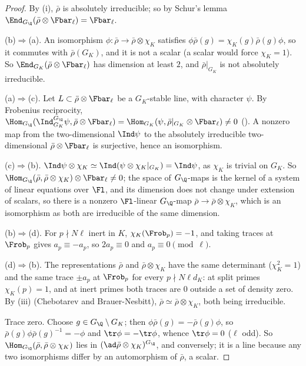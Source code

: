 \begin{proof}
By (i), $\bar\rho$ is absolutely irreducible; so by Schur's lemma $\End_{G_\Q}(\bar\rho\otimes\Fbar_\ell)=\Fbar_\ell$.

(b)$\Rightarrow$(a). An isomorphism $\phi\colon\bar\rho\to\bar\rho\otimes\chi_K$ satisfies $\phi\bar\rho(g)=\chi_K(g)\bar\rho(g)\phi$, so it commutes with $\bar\rho(G_K)$, and it is not a scalar
(a scalar would force $\chi_K=1$). So $\End_{G_K}(\bar\rho\otimes\Fbar_\ell)$ has dimension at least $2$, and $\bar\rho|_{G_K}$ is not absolutely irreducible.

(a)$\Rightarrow$(c). Let $L\subset\bar\rho\otimes\Fbar_\ell$ be a $G_K$-stable line, with character $\psi$. By Frobenius reciprocity,
$\Hom_{G_\Q}(\Ind_{G_K}^{G_\Q}\psi,\bar\rho\otimes\Fbar_\ell)=\Hom_{G_K}(\psi,\bar\rho|_{G_K}\otimes\Fbar_\ell)\ne0$ (). A nonzero map from the two-dimensional $\Ind\psi$
to the absolutely irreducible two-dimensional $\bar\rho\otimes\Fbar_\ell$ is surjective, hence an isomorphism.

(c)$\Rightarrow$(b). $\Ind\psi\otimes\chi_K\simeq\Ind(\psi\otimes\chi_K|_{G_K})=\Ind\psi$, as $\chi_K$ is trivial on $G_K$. So $\Hom_{G_\Q}(\bar\rho,\bar\rho\otimes\chi_K)\otimes\Fbar_\ell\ne0$; the space of
$G_\Q$-maps is the kernel of a system of linear equations over $\Fl$, and its dimension does not change under extension of scalars, so there is a
nonzero $\Fl$-linear $G_\Q$-map $\bar\rho\to\bar\rho\otimes\chi_K$, which is an isomorphism as both are irreducible of the same dimension.

(b)$\Rightarrow$(d). For $p\nmid N\ell$ inert in $K$, $\chi_K(\Frob_p)=-1$, and taking traces at $\Frob_p$ gives $a_p\equiv-a_p$, so $2a_p\equiv0$ and $a_p\equiv0\pmod\ell$.

(d)$\Rightarrow$(b). The representations $\bar\rho$ and $\bar\rho\otimes\chi_K$ have the same determinant ($\chi_K^2=1$) and the same trace $\pm a_p$ at $\Frob_p$ for every
$p\nmid N\ell d_K$: at split primes $\chi_K(p)=1$, and at inert primes both traces are $0$ outside a set of density zero. By
(iii) (Chebotarev and Brauer-Nesbitt), $\bar\rho\simeq\bar\rho\otimes\chi_K$, both being irreducible.

Trace zero. Choose $g\in G_\Q\setminus G_K$; then $\phi\bar\rho(g)=-\bar\rho(g)\phi$, so $\bar\rho(g)\phi\bar\rho(g)^{-1}=-\phi$ and $\tr\phi=-\tr\phi$, whence $\tr\phi=0$ ($\ell$ odd). So
$\Hom_{G_\Q}(\bar\rho,\bar\rho\otimes\chi_K)$ lies in $(\ad\bar\rho\otimes\chi_K)^{G_\Q}$, and conversely; it is a line because any two isomorphisms differ by an automorphism of
$\bar\rho$, a scalar.
\end{proof}


